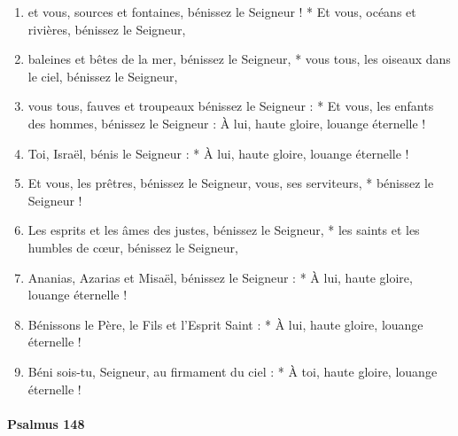 \documentclass[twoside]{article}
\begin{document}
\begin{paracol}[1]{2}
\begin{enumerate}[wide, itemsep=0mm, labelwidth=!, labelindent=0pt, label=\color{gregoriocolor}\theenumi]
\item et vous, sources et fontaines,
   bénissez le Seigneur ! *
 Et vous, océans et rivières,
   bénissez le Seigneur,
   
\item baleines et bêtes de la mer,
   bénissez le Seigneur, *
vous tous, les oiseaux dans le ciel,
   bénissez le Seigneur,
   
\item vous tous, fauves et troupeaux
   bénissez le Seigneur : *
Et vous, les enfants des hommes,
   bénissez le Seigneur :
À lui, haute gloire, louange éternelle !

\item Toi, Israël,
   bénis le Seigneur : *
À lui, haute gloire, louange éternelle !

\item Et vous, les prêtres,
   bénissez le Seigneur,
vous, ses serviteurs, *
   bénissez le Seigneur !

\item Les esprits et les âmes des justes,
   bénissez le Seigneur, *
 les saints et les humbles de cœur,
   bénissez le Seigneur,
\item Ananias, Azarias et Misaël,
   bénissez le Seigneur : *
À lui, haute gloire, louange éternelle !

\item Bénissons le Père, le Fils et l'Esprit Saint : *
À lui, haute gloire, louange éternelle !

\item Béni sois-tu, Seigneur, au firmament du ciel : *
À toi, haute gloire, louange éternelle !
\end{enumerate}

\switchcolumn*
\paragraph{Psalmus 148}



\end{paracol}
\end{document}
